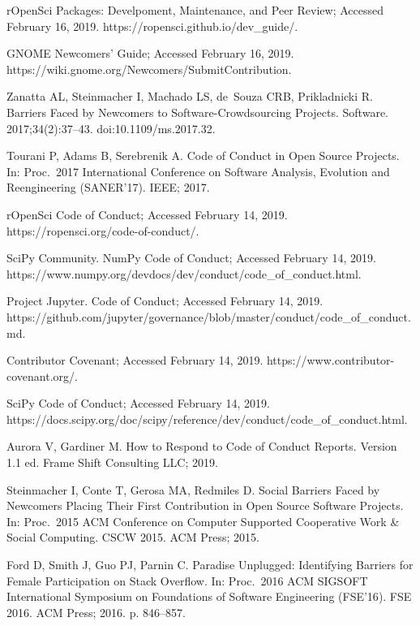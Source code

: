 \documentclass[10pt,letterpaper]{article}
\begin{document}
\begin{thebibliography}{10}
rOpenSci Packages: Develpoment, Maintenance, and Peer Review; Accessed February
  16, 2019.
\newblock https://ropensci.github.io/dev\_guide/.

GNOME Newcomers' Guide; Accessed February 16, 2019.
\newblock https://wiki.gnome.org/Newcomers/SubmitContribution.

Zanatta AL, Steinmacher I, Machado LS, de~Souza CRB, Prikladnicki R.
\newblock Barriers Faced by Newcomers to Software-Crowdsourcing Projects.
 Software. 2017;34(2):37--43.
\newblock doi:{10.1109/ms.2017.32}.

Tourani P, Adams B, Serebrenik A.
\newblock Code of Conduct in Open Source Projects.
\newblock In: Proc.\ 2017 International Conference on Software Analysis,
  Evolution and Reengineering ({SANER'17}). {IEEE}; 2017.

rOpenSci Code of Conduct; Accessed February 14, 2019.
\newblock https://ropensci.org/code-of-conduct/.

{SciPy Community}. NumPy Code of Conduct; Accessed February 14, 2019.
\newblock https://www.numpy.org/devdocs/dev/conduct/code\_of\_conduct.html.

{Project Jupyter}. Code of Conduct; Accessed February 14, 2019.
\newblock
  https://github.com/jupyter/governance/blob/master/conduct/code\_of\_conduct.md.

Contributor Covenant; Accessed February 14, 2019.
\newblock https://www.contributor-covenant.org/.

SciPy Code of Conduct; Accessed February 14, 2019.
\newblock
  https://docs.scipy.org/doc/scipy/reference/dev/conduct/code\_of\_conduct.html.

Aurora V, Gardiner M.
\newblock How to Respond to Code of Conduct Reports.
\newblock Version 1.1 ed. Frame Shift Consulting LLC; 2019.

Steinmacher I, Conte T, Gerosa MA, Redmiles D.
\newblock Social Barriers Faced by Newcomers Placing Their First Contribution
  in Open Source Software Projects.
\newblock In: Proc.\ 2015 {ACM} Conference on Computer Supported Cooperative
  Work {\&} Social Computing. CSCW 2015. {ACM} Press; 2015.

Ford D, Smith J, Guo PJ, Parnin C.
\newblock Paradise Unplugged: Identifying Barriers for Female Participation on
  Stack Overflow.
\newblock In: Proc.\ 2016 ACM SIGSOFT International Symposium on Foundations of
  Software Engineering ({FSE'16}). FSE 2016. {ACM} Press; 2016. p. 846--857.


\end{thebibliography}
\end{document}
